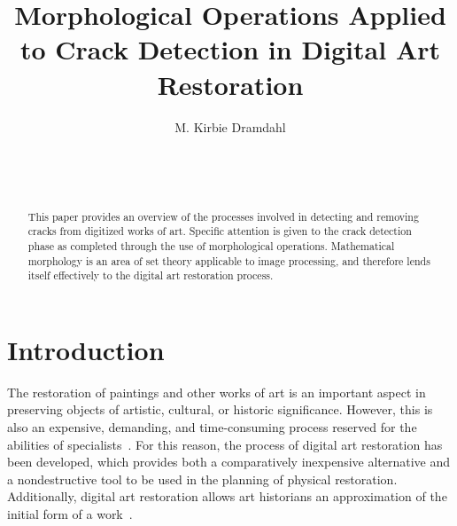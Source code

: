 \documentclass{sig-alternate}
\begin{document}

\title{Morphological Operations Applied to Crack Detection in Digital Art Restoration}


\author{
\alignauthor
M. Kirbie Dramdahl\\
	\\
	\\
	\\
}

\maketitle
\begin{abstract}
This paper provides an overview of the processes involved in detecting and removing cracks from digitized works of art. Specific attention is given to the crack detection phase as completed through the use of morphological operations. Mathematical morphology is an area of set theory applicable to image processing, and therefore lends itself effectively to the digital art restoration process.
\end{abstract}




\section{Introduction}\label{introduction}
The restoration of paintings and other works of art is an important aspect in preserving objects of artistic, cultural, or historic significance. However, this is also an expensive, demanding, and time-consuming process reserved for the abilities of specialists~\cite{Theran:2013}. For this reason, the process of digital art restoration has been developed, which provides both a comparatively inexpensive alternative and a nondestructive tool to be used in the planning of physical restoration. Additionally, digital art restoration allows art historians an approximation of the initial form of a work~\cite{TopHat:2010}.
\end{document}
